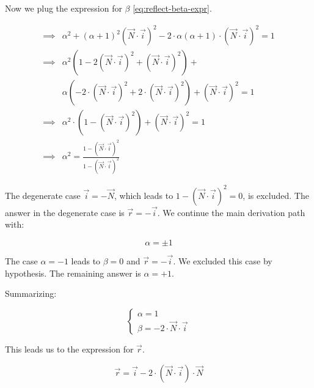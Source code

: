 Now we plug the expression for $\beta$ \cref{eq:reflect-beta-expr}.

\begin{equation} \begin{split}
\implies& \alpha^2 + (\alpha + 1)^2
(\overrightarrow{N} \cdot \overrightarrow{i})^2
- 2 \cdot \alpha (\alpha + 1) \cdot
(\overrightarrow{N} \cdot \overrightarrow{i})^2 = 1 \\
\implies& \alpha^2 (1 - 2 (\overrightarrow{N} \cdot \overrightarrow{i})^2
+ (\overrightarrow{N} \cdot \overrightarrow{i})^2) + \\
& \alpha (-2\cdot (\overrightarrow{N} \cdot \overrightarrow{i})^2
        +2 \cdot (\overrightarrow{N} \cdot \overrightarrow{i})^2) +
(\overrightarrow{N} \cdot \overrightarrow{i})^2 = 1 \\
\implies& \alpha^2 \cdot (1 - (\overrightarrow{N} \cdot \overrightarrow{i})^2)
+ (\overrightarrow{N} \cdot \overrightarrow{i})^2 = 1 \\
\implies& \alpha^2 = \frac{1 - (\overrightarrow{N} \cdot \overrightarrow{i})^2}
                          {1 - (\overrightarrow{N} \cdot \overrightarrow{i})^2}
\end{split} \end{equation}

The degenerate case $\overrightarrow{i} = - \overrightarrow{N}$, which
leads to $1 - (\overrightarrow{N} \cdot \overrightarrow{i})^2 = 0$, is excluded.
The answer in the degenerate case is $\overrightarrow{r} = -
\overrightarrow{i}$. We continue the main derivation path with:

\begin{equation}
\alpha = \pm 1
\end{equation}

The case $\alpha = -1$ leads to $\beta = 0$ and $\overrightarrow{r} = -
\overrightarrow{i}$. We excluded this case by hypothesis.  The remaining answer
is $\alpha = + 1$.

Summarizing:

\begin{equation} \begin{cases}
\alpha = 1 \\
\beta = -2 \cdot \overrightarrow{N} \cdot \overrightarrow{i}
\end{cases} \end{equation}

This leads us to the expression for $\overrightarrow{r}$.

\begin{equation}
\overrightarrow{r} = \overrightarrow{i} - 2 \cdot (\overrightarrow{N} \cdot
\overrightarrow{i}) \cdot \overrightarrow{N}
\end{equation}

